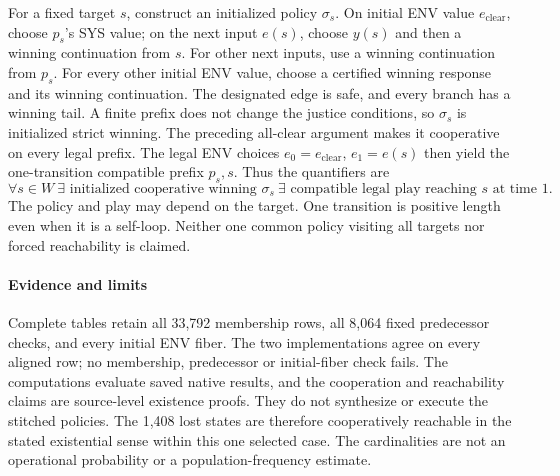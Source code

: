 For a fixed target $s$, construct an initialized policy $\sigma_s$.
On initial ENV value $e_{\mathrm{clear}}$, choose $p_s$'s SYS value;
on the next input $e(s)$, choose $y(s)$ and then a winning continuation
from $s$. For other next inputs, use a winning continuation from $p_s$.
For every other initial ENV value, choose a certified winning response
and its winning continuation. The designated edge is safe, and every
branch has a winning tail. A finite prefix does not change the justice
conditions, so $\sigma_s$ is initialized strict winning. The preceding
all-clear argument makes it cooperative on every legal prefix.
The legal ENV choices $e_0=e_{\mathrm{clear}}$, $e_1=e(s)$ then yield
the one-transition compatible prefix $p_s,s$. Thus the quantifiers are
\[
 \forall s\in W\ \exists\text{ initialized cooperative winning }\sigma_s
 \ \exists\text{ compatible legal play reaching }s\text{ at time }1.
\]
The policy and play may depend on the target. One transition is positive
length even when it is a self-loop. Neither one common policy visiting
all targets nor forced reachability is claimed.

\paragraph{Evidence and limits}
Complete tables retain all 33,792 membership rows, all 8,064 fixed
predecessor checks, and every initial ENV fiber. The two implementations
agree on every aligned row; no membership, predecessor or initial-fiber
check fails. The computations evaluate saved native results, and the
cooperation and reachability claims are source-level existence proofs.
They do not synthesize or execute the stitched policies. The 1,408 lost
states are therefore cooperatively reachable in the stated existential
sense within this one selected case. The cardinalities are not an
operational probability or a population-frequency estimate.
